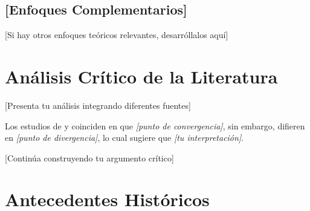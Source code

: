 \subsection{[Enfoques Complementarios]}
\label{subsec:enfoques_complementarios}

[Si hay otros enfoques teóricos relevantes, desarróllalos aquí]

\section{Análisis Crítico de la Literatura}
\label{sec:analisis_critico}


[Presenta tu análisis integrando diferentes fuentes]

Los estudios de \cite{garcia2022} y \cite{WHO2020} coinciden en que \textit{[punto de convergencia]}, sin embargo, difieren en \textit{[punto de divergencia]}, lo cual sugiere que \textit{[tu interpretación]}.


[Continúa construyendo tu argumento crítico]


\section{Antecedentes Históricos}
\label{sec:antecedentes_historicos}


